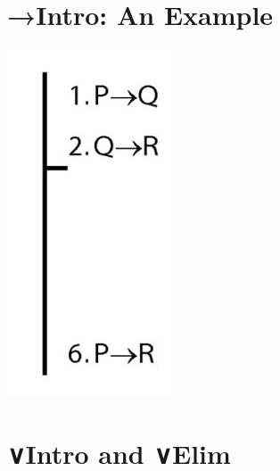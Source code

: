 \documentclass[12pt]{extarticle}
\begin{document}
\begin{multicols*}{3}
 
\section{→Intro: An Example}
 
\begin{center}
\includegraphics[scale=0.3]{img/proof_arrow_intro.png}
\end{center}
 
 
\section{∨Intro and ∨Elim}
 

\end{multicols*}
\end{document}
